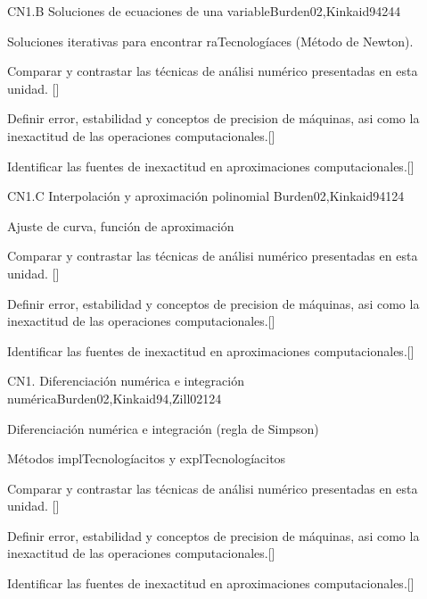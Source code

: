 \begin{syllabus}
\begin{unit}{}{CN1.B Soluciones de ecuaciones de una variable}{Burden02,Kinkaid94}{24}{4}
\begin{topics}
      \item Soluciones iterativas para encontrar raTecnologíaces (Método de Newton).
   \end{topics}
   \begin{learningoutcomes}
      \item Comparar y contrastar las técnicas de análisi numérico presentadas en esta unidad. [\Usage]
      \item Definir error, estabilidad y conceptos de precision de máquinas, asi como la inexactitud de las operaciones computacionales.[\Usage]
      \item Identificar las fuentes de inexactitud en aproximaciones computacionales.[\Usage]
   \end{learningoutcomes}
\end{unit}

\begin{unit}{}{CN1.C Interpolación y aproximación polinomial }{Burden02,Kinkaid94}{12}{4}
\begin{topics}
      \item Ajuste de curva, función de aproximación
   \end{topics}

   \begin{learningoutcomes}
      \item Comparar y contrastar las técnicas de análisi numérico presentadas en esta unidad. [\Usage]
      \item Definir error, estabilidad y conceptos de precision de máquinas, asi como la inexactitud de las operaciones computacionales.[\Usage]
      \item Identificar las fuentes de inexactitud en aproximaciones computacionales.[\Usage]
   \end{learningoutcomes}
\end{unit}

\begin{unit}{}{CN1. Diferenciación numérica e integración numérica}{Burden02,Kinkaid94,Zill02}{12}{4}
\begin{topics}
      \item Diferenciación numérica e integración (regla de Simpson)
      \item Métodos implTecnologíacitos y explTecnologíacitos
   \end{topics}
   \begin{learningoutcomes}
       \item Comparar y contrastar las técnicas de análisi numérico presentadas en esta unidad. [\Usage]
      \item Definir error, estabilidad y conceptos de precision de máquinas, asi como la inexactitud de las operaciones computacionales.[\Usage]
      \item Identificar las fuentes de inexactitud en aproximaciones computacionales.[\Usage]
   \end{learningoutcomes}
\end{unit}


\end{syllabus}
